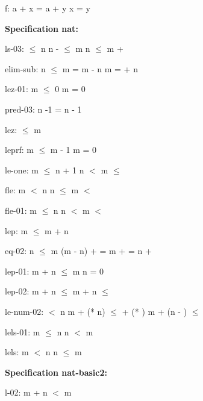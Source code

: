 \documentclass[a4paper]{article}
\begin{document}
f: 
 \Fol a + x = a + y \Equiv x = y



{\bf Specification nat:}

ls-03: 
 $\le$ n
 \Fol n -  $\le$ m \Equiv n $\le$ m + 



elim-sub: 
n $\le$ m
 \Fol {} = m - n \Equiv m =  + n



lez-01: 
 \Fol m $\le$ 0 \Equiv m = 0



pred-03: 
 \Fol n -1 = n - 1



lez: 
  $\le$ m



leprf: 
 \Fol m $\le$ m - 1 \Imp m = 0



le-one: 
 \Fol m $\le$ n + 1 \And n $<$  \Imp m $\le$ 



fle: 
 \Fol m $<$ n \And n $\le$  \Imp m $<$ 



fle-01: 
 \Fol m $\le$ n \And n $<$  \Imp m $<$ 



lep: 
 \Fol m $\le$ m + n



eq-02: 
n $\le$ m
 \Fol (m - n) +  =  \Equiv m +  = n + 



lep-01: 
 \Fol m + n $\le$ m \Equiv n = 0



lep-02: 
 \Fol m + n $\le$ m +  \Equiv n $\le$ 



le-num-02: 
 $<$ n
 \Fol m + (* n) $\le$  + (* ) \Equiv m + (n - ) $\le$ 



lels-01: 
 \Fol \Not m $\le$ n \Equiv n $<$ m



lels: 
 \Fol \Not m $<$ n \Equiv n $\le$ m



{\bf Specification nat-basic2:}

l-02: 
 \Fol \Not m + n $<$ m
\end{document}
